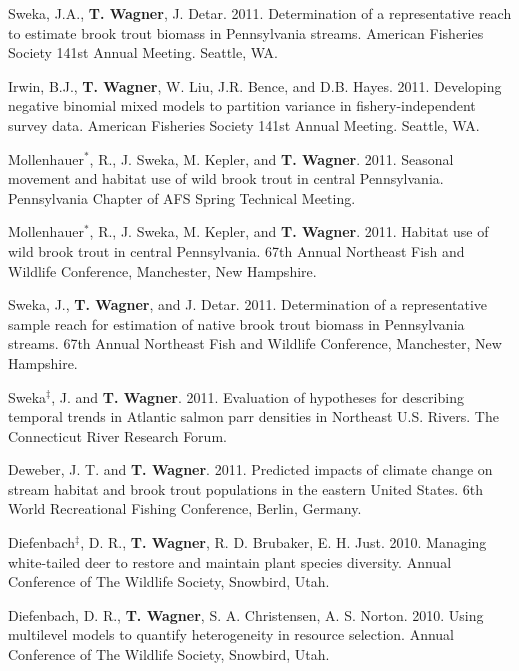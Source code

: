 \documentclass[10pt]{article}
\begin{document}
\begin{flushleft}
\begin{etaremune}
\item Sweka, J.A., {\bf T. Wagner}, J. Detar. 2011. Determination of a representative reach to estimate brook trout biomass in Pennsylvania streams. American Fisheries Society 141st Annual Meeting. Seattle, WA.

\item Irwin, B.J., {\bf T. Wagner}, W. Liu, J.R. Bence, and D.B. Hayes. 2011. Developing negative binomial mixed models to partition variance in fishery-independent survey data. American Fisheries Society 141st Annual Meeting. Seattle, WA.

\item Mollenhauer$^*$, R., J. Sweka, M. Kepler, and  {\bf T. Wagner}. 2011. Seasonal movement and habitat use of wild brook trout in central Pennsylvania. Pennsylvania Chapter of AFS Spring Technical Meeting.

\item Mollenhauer$^*$, R., J. Sweka, M. Kepler, and  {\bf T. Wagner}. 2011. Habitat use of wild brook trout in central Pennsylvania. 67th Annual Northeast Fish and Wildlife Conference, Manchester, New Hampshire.

\item Sweka, J.,  {\bf T. Wagner}, and J. Detar. 2011. Determination of a representative sample reach for estimation of native brook trout biomass in Pennsylvania streams. 67th Annual Northeast Fish and Wildlife Conference, Manchester, New Hampshire.

\item Sweka$^\ddagger$, J. and  {\bf T. Wagner}. 2011. Evaluation of hypotheses for describing temporal trends in Atlantic salmon parr densities in Northeast U.S. Rivers. The Connecticut River Research Forum.

\item Deweber, J. T. and {\bf T. Wagner}. 2011. Predicted impacts of climate change on stream habitat and brook trout populations in the eastern United States. 6th World Recreational Fishing Conference, Berlin, Germany.


\item Diefenbach$^\ddagger$, D. R., {\bf T. Wagner}, R. D. Brubaker, E. H. Just. 2010. Managing white-tailed deer to restore and maintain plant species diversity. Annual Conference of The Wildlife Society, Snowbird, Utah. 

\item Diefenbach, D. R.,  {\bf T. Wagner}, S. A. Christensen, A. S. Norton. 2010. Using multilevel models to quantify heterogeneity in resource selection. Annual Conference of The Wildlife Society, Snowbird, Utah.


\end{etaremune}
\end{flushleft}
\end{document}
